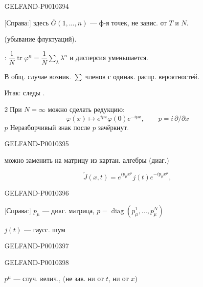 \begin{GelfandAdjacentEvidence}{GELFAND-P001039}{4}


[Справа:] здесь $\overline G(1,\ldots,n)$ --- ф-я точек, не завис. от $T$ и $N$.

(убывание флуктуаций).

:
$\dfrac1N\operatorname{tr}\varphi^n=\dfrac1N\sum_\lambda\lambda^n$ и дисперсия уменьшается.

В общ. случае возник. $\sum$ членов с одинак. распр. вероятностей.

Итак: следы .

\textcircled{2}\quad При $N=\infty$ можно сделать редукцию:
\begin{equation*}
\varphi(x)\longmapsto e^{ipx}\varphi(0)e^{-ipx},\qquad
p=i\,\partial/\partial x
\tag{11}
\end{equation*}
$p$ Неразборчивый знак после \(p\) зачёркнут.
\end{GelfandAdjacentEvidence}
\begin{GelfandAdjacentEvidence}{GELFAND-P001039}{5}

можно заменить на матрицу из картан. алгебры (диаг.)

\begin{equation*}
\widetilde J(x,t)=e^{ip_\mu x^\mu}j(t)e^{-ip_\mu x^\mu},
\tag{12}
\end{equation*}
\end{GelfandAdjacentEvidence}
\begin{GelfandAdjacentEvidence}{GELFAND-P001039}{6}


[Справа:] $p_\mu$ --- диаг. матрица,
$p=\operatorname{diag}(p_\mu^1,\ldots,p_\mu^N)$

$j(t)$ --- гаусс. шум

\end{GelfandAdjacentEvidence}
\begin{GelfandAdjacentEvidence}{GELFAND-P001039}{7}


\end{GelfandAdjacentEvidence}
\begin{GelfandAdjacentEvidence}{GELFAND-P001039}{8}

$p^\mu$ --- случ. велич., (не зав. ни от $t$, ни от $x$)
\end{GelfandAdjacentEvidence}


